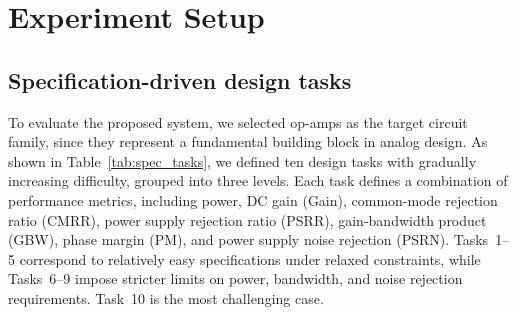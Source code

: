 \section{Experiment Setup}

\subsection{Specification-driven design tasks}


To evaluate the proposed system, we selected op-amps as the target circuit family, since they represent a fundamental building block in analog design. As shown in Table~\ref{tab:spec_tasks}, we defined ten design tasks with gradually increasing difficulty, grouped into three levels.  Each task defines a combination of performance metrics, including power, DC gain (Gain), common-mode rejection ratio (CMRR), power supply rejection ratio (PSRR), gain-bandwidth product (GBW), phase margin (PM), and power supply noise rejection (PSRN). Tasks~1--5 correspond to relatively easy specifications under relaxed constraints, while Tasks~6--9 impose stricter limits on power, bandwidth, and noise rejection requirements. Task~10 is the most challenging case.

